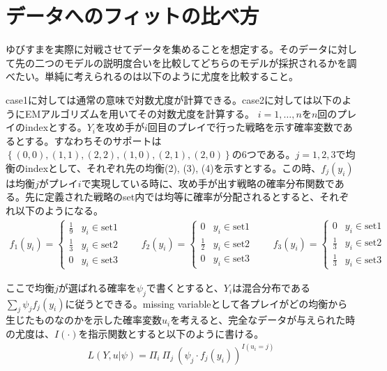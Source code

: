 \documentclass{jsarticle}
\begin{document}
\section{データへのフィットの比べ方}
ゆびすまを実際に対戦させてデータを集めることを想定する。そのデータに対して先の二つのモデルの説明度合いを比較してどちらのモデルが採択されるかを調べたい。単純に考えられるのは以下のように尤度を比較すること。

case1に対しては通常の意味で対数尤度が計算できる。case2に対しては以下のようにEMアルゴリズムを用いてその対数尤度を計算する。
$i = 1, \dots, n$を$n$回のプレイのindexとする。$Y_i$を攻め手が$i$回目のプレイで行った戦略を示す確率変数であるとする。すなわちそのサポートは$\left\{ (0,0), (1,1), (2,2), (1,0), (2,1), (2,0)\right\}$の6つである。$j = 1, 2, 3$で均衡のindexとして、それぞれ先の均衡(2), (3), (4)を示すとする。この時、$f_j(y_i)$は均衡$j$がプレイ$i$で実現している時に、攻め手が出す戦略の確率分布関数である。先に定義された戦略のset内では均等に確率が分配されるとすると、それぞれ以下のようになる。
\begin{align}
	f_1(y_i) = \begin{cases}
			\frac{1}{9} & y_i \in \text{set1}\\[8pt]
			\frac{1}{3} & y_i \in \text{set2}\\[8pt]
			0 & y_i \in \text{set3}
		\end{cases}\qquad
	f_2(y_i) = \begin{cases}
			0 & y_i \in \text{set1}\\[8pt]
			\frac{1}{2} & y_i \in \text{set2}\\[8pt]
			0 & y_i \in \text{set3}
		\end{cases}\qquad
	f_3(y_i) = \begin{cases}
			0 & y_i \in \text{set1}\\[8pt]
			\frac{1}{3} & y_i \in \text{set2}\\[8pt]
			\frac{1}{3} & y_i \in \text{set3}
		\end{cases}
\end{align}

ここで均衡$j$が選ばれる確率を$\psi_j$で書くとすると、$Y_i$は混合分布である$\sum_j \psi_j f_j(y_i)$に従うとできる。missing variableとして各プレイがどの均衡から生じたものなのかを示した確率変数$u_i$を考えると、完全なデータが与えられた時の尤度は、$I(\cdot)$を指示関数とすると以下のように書ける。
\begin{align}
	L(Y, u | \psi) = \Pi_i\ \Pi_j\ (\psi_j\cdot f_j(y_i))^{I(u_i = j)}
\end{align}
\end{document}
